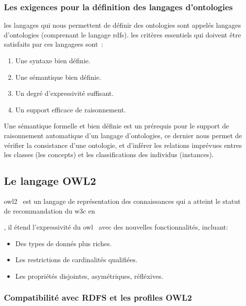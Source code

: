 \subsubsection{Les exigences pour la définition des langages
  d'ontologies}
\label{sec:semantic-web-owl-ontolgies-requirements}

les langages qui nous permettent de définir des ontologies sont
appelés langages d'ontologies (comprenant le langage \acrshort{rdfs}).
les critères essentiels qui doivent être satisfaits par ces langagees
sont~\cite{antoniou2012semantic}:

\begin{enumerate}
\item Une syntaxe bien définie.
\item Une sémantique bien définie.
\item Un degré d'expressivité suffisant.
\item Un support efficace de raisonnement.
\end{enumerate}

Une sémantique formelle et bien définie est un prérequis pour le
support de raisonnement automatique d'un langage d'ontologies, ce
dernier nous permet de vérifier la consistance d'une ontologie, et
d'inférer les relations imprévues entres les classes (les concepts) et
les classifications des individus (instances).\medskip

\subsection{Le langage OWL2}
\label{sec:semantic-web-owl-owl2}
\acrshort{owl2}~\cite{w3c2009owl} est un langage de représentation des
connaissances qui a atteint le statut de recommandation du
\acrshort{w3c} en \date{2009}, il étend l'expressivité du
\acrshort{owl}~\cite{mcguinness2004owl} avec des nouvelles
fonctionnalités, incluant:

\SpecialItem
\begin{itemize}
\item Des types de donnés plus riches.
\item Les restrictions de cardinalités qualifiées.
\item Les propriétés disjointes, asymétriques, réfléxives.
\end{itemize}
\enddescription

\subsubsection{Compatibilité avec RDFS et les profiles OWL2}
\label{sec:semantic-web-owl-owl2-rdfs-compatibility}

